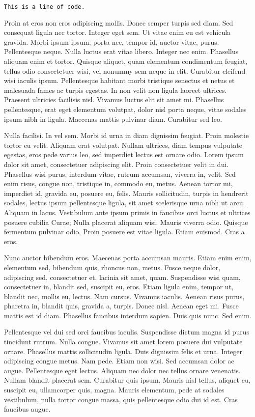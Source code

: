 \texttt{This is a line of code.}

Proin at eros non eros adipiscing mollis. Donec semper turpis sed diam. Sed
consequat ligula nec tortor. Integer eget sem. Ut vitae enim eu est vehicula
gravida. Morbi ipsum ipsum, porta nec, tempor id, auctor vitae, purus.
Pellentesque neque. Nulla luctus erat vitae libero. Integer nec enim. Phasellus
aliquam enim et tortor. Quisque aliquet, quam elementum condimentum feugiat,
tellus odio consectetuer wisi, vel nonummy sem neque in elit. Curabitur
eleifend wisi iaculis ipsum. Pellentesque habitant morbi tristique senectus et
netus et malesuada fames ac turpis egestas. In non velit non ligula laoreet
ultrices. Praesent ultricies facilisis nisl. Vivamus luctus elit sit amet mi.
Phasellus pellentesque, erat eget elementum volutpat, dolor nisl porta neque,
vitae sodales ipsum nibh in ligula. Maecenas mattis pulvinar diam. Curabitur
sed leo.

Nulla facilisi. In vel sem. Morbi id urna in diam dignissim feugiat. Proin
molestie tortor eu velit. Aliquam erat volutpat. Nullam ultrices, diam tempus
vulputate egestas, eros pede varius leo, sed imperdiet lectus est ornare odio.
Lorem ipsum dolor sit amet, consectetuer adipiscing elit. Proin consectetuer
velit in dui. Phasellus wisi purus, interdum vitae, rutrum accumsan, viverra
in, velit. Sed enim risus, congue non, tristique in, commodo eu, metus. Aenean
tortor mi, imperdiet id, gravida eu, posuere eu, felis. Mauris sollicitudin,
turpis in hendrerit sodales, lectus ipsum pellentesque ligula, sit amet
scelerisque urna nibh ut arcu. Aliquam in lacus. Vestibulum ante ipsum primis
in faucibus orci luctus et ultrices posuere cubilia Curae; Nulla placerat
aliquam wisi. Mauris viverra odio. Quisque fermentum pulvinar odio. Proin
posuere est vitae ligula. Etiam euismod. Cras a eros.

Nunc auctor bibendum eros. Maecenas porta accumsan mauris. Etiam enim enim,
elementum sed, bibendum quis, rhoncus non, metus. Fusce neque dolor, adipiscing
sed, consectetuer et, lacinia sit amet, quam. Suspendisse wisi quam,
consectetuer in, blandit sed, suscipit eu, eros. Etiam ligula enim, tempor ut,
blandit nec, mollis eu, lectus. Nam cursus. Vivamus iaculis. Aenean risus
purus, pharetra in, blandit quis, gravida a, turpis. Donec nisl. Aenean eget
mi. Fusce mattis est id diam. Phasellus faucibus interdum sapien. Duis quis
nunc. Sed enim.

Pellentesque vel dui sed orci faucibus iaculis. Suspendisse dictum magna id
purus tincidunt rutrum. Nulla congue. Vivamus sit amet lorem posuere dui
vulputate ornare. Phasellus mattis sollicitudin ligula. Duis dignissim felis et
urna. Integer adipiscing congue metus. Nam pede. Etiam non wisi. Sed accumsan
dolor ac augue. Pellentesque eget lectus. Aliquam nec dolor nec tellus ornare
venenatis. Nullam blandit placerat sem. Curabitur quis ipsum. Mauris nisl
tellus, aliquet eu, suscipit eu, ullamcorper quis, magna. Mauris elementum,
pede at sodales vestibulum, nulla tortor congue massa, quis pellentesque odio
dui id est. Cras faucibus augue.


